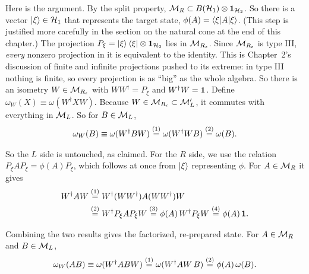 Here is the argument. By the split property, $\mathcal{M}_R\subset B(\mathcal{H}_1)\otimes\mathbf{1}_{\mathcal{H}_2}$. So there is a vector
$\ket\xi\in\mathcal{H}_1$ that represents the target state, $\phi(A)=\braket{\xi|A|\xi}$. (This step is justified more
carefully in the section on the natural cone at the end of this chapter.) The projection
$P_\xi=\ket\xi\bra\xi\otimes\mathbf{1}_{\mathcal{H}_2}$ lies in $\mathcal{M}_{R_\epsilon}$. Since $\mathcal{M}_{R_\epsilon}$ is type III,
\emph{every} nonzero projection in it is equivalent to the identity. This is Chapter~2's discussion of finite
and infinite projections pushed to its extreme: in type III nothing is finite, so every projection is as ``big''
as the whole algebra. So there is an isometry $W\in\mathcal{M}_{R_\epsilon}$ with $WW^\dagger=P_\xi$ and
$W^\dagger W=\mathbf{1}$. Define $\omega_W(X)\equiv\omega(W^\dagger XW)$. Because $W\in\mathcal{M}_{R_\epsilon}\subset\mathcal{M}_L'$,
it commutes with everything in $\mathcal{M}_L$. So for $B\in\mathcal{M}_L$,
\begin{align}
\omega_W(B)\equiv\omega(W^\dagger BW) \overset{(1)}{=} \omega(W^\dagger W B) \overset{(2)}{=} \omega(B) . \notag
\end{align}
\quad
{}

So the $L$ side is untouched, as claimed. For the $R$ side, we use the relation $P_\xi AP_\xi=\phi(A)P_\xi$,
which follows at once from $\ket\xi$ representing $\phi$. For $A\in\mathcal{M}_R$ it gives
\begin{align}
W^\dagger AW &\overset{(1)}{=} W^\dagger (WW^\dagger)A(WW^\dagger)W \notag\\
&\overset{(2)}{=} W^\dagger P_\xi AP_\xi W
\overset{(3)}{=} \phi(A)\,W^\dagger P_\xi W
\overset{(4)}{=} \phi(A)\,\mathbf{1} . \notag
\end{align}
\quad
{}\quad
{}\quad
{}

Combining the two results gives the factorized, re-prepared state. For $A\in\mathcal{M}_R$ and $B\in\mathcal{M}_L$,
\begin{align}
\omega_W(AB)\equiv\omega(W^\dagger ABW) \overset{(1)}{=} \omega(W^\dagger AW\,B) \overset{(2)}{=} \phi(A)\,\omega(B) .
\notag
\end{align}
\quad
{}

